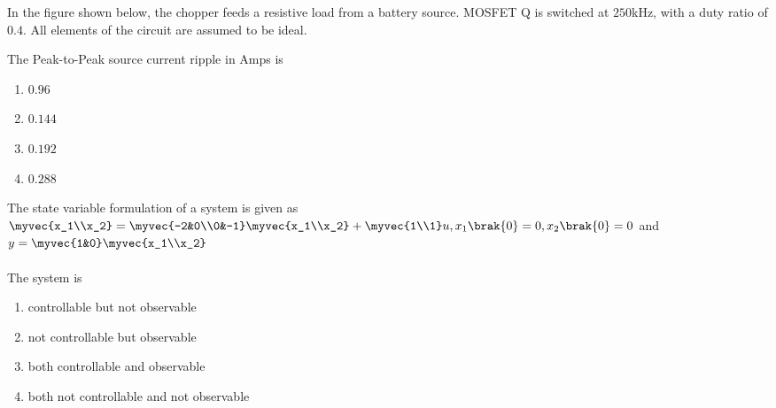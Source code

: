 \item{
In the figure shown below, the chopper feeds a resistive load from a battery source. MOSFET Q is switched at $250$kHz, with a duty ratio of $0.4$. All elements of the circuit are assumed to be ideal.
\begin{figure}[H]
\centering
{}%

\label{fig:my_label}
\end{figure}
The Peak-to-Peak source current ripple in Amps is
\begin{multicols}{4}
\begin{enumerate}
\item $0.96$
\item $0.144$
\item $0.192$ 
\item $0.288$
\end{enumerate}
\end{multicols}
}
\item{
The state variable formulation of a system is given as\\
$\myvec{x_1\\x_2}=\myvec{-2&0\\0&-1}\myvec{x_1\\x_2}+\myvec{1\\1}u, x_1\brak{0}=0,x_2\brak{0}=0$ and $y=\myvec{1&0}\myvec{x_1\\x_2}$\\\\
The system is

\begin{enumerate}
\item controllable but not observable
\item not controllable but observable
\item both controllable and observable
\item both not controllable and not observable
\end{enumerate}

}
